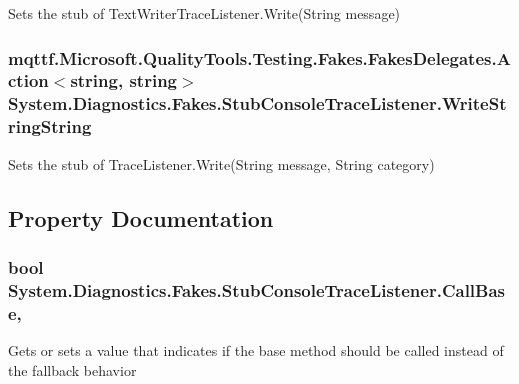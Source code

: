Sets the stub of Text\-Writer\-Trace\-Listener.\-Write(\-String message)

\hypertarget{class_system_1_1_diagnostics_1_1_fakes_1_1_stub_console_trace_listener_acef06285e470e0404b85c5b47d6140ac}{
\subsubsection[{Write\-String\-String}]{\setlength{\rightskip}{0pt plus 5cm}mqttf.\-Microsoft.\-Quality\-Tools.\-Testing.\-Fakes.\-Fakes\-Delegates.\-Action$<$string, string$>$ System.\-Diagnostics.\-Fakes.\-Stub\-Console\-Trace\-Listener.\-Write\-String\-String}}\label{class_system_1_1_diagnostics_1_1_fakes_1_1_stub_console_trace_listener_acef06285e470e0404b85c5b47d6140ac}


Sets the stub of Trace\-Listener.\-Write(\-String message, String category)



\subsection{Property Documentation}
\hypertarget{class_system_1_1_diagnostics_1_1_fakes_1_1_stub_console_trace_listener_ae65e36e6e01eff45f3c4afad1a4d0462}{
\subsubsection[{Call\-Base}]{\setlength{\rightskip}{0pt plus 5cm}bool System.\-Diagnostics.\-Fakes.\-Stub\-Console\-Trace\-Listener.\-Call\-Base\hspace{0.3cm}{\ttfamily [get]}, {\ttfamily [set]}}}\label{class_system_1_1_diagnostics_1_1_fakes_1_1_stub_console_trace_listener_ae65e36e6e01eff45f3c4afad1a4d0462}


Gets or sets a value that indicates if the base method should be called instead of the fallback behavior

